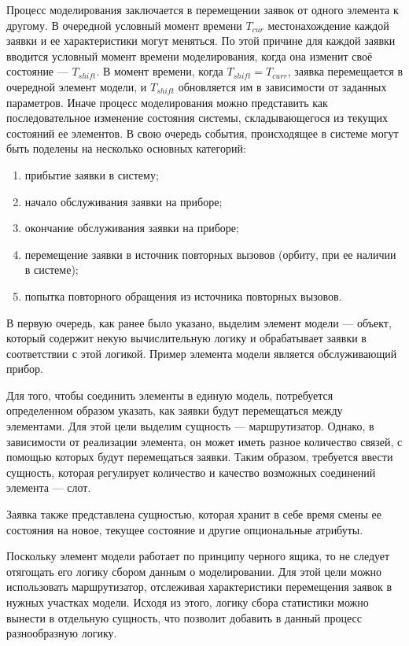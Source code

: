 Процесс моделирования заключается в перемещении заявок от одного элемента к другому. В очередной условный момент времени $T_{cur}$ местонахождение каждой заявки и ее характеристики могут меняться. По этой причине для каждой заявки вводится условный момент времени моделирования, когда она изменит своё состояние --- $T_{shift}$. В момент времени, когда $T_{shift} = T_{curr}$, заявка перемещается в очередной элемент модели, и  $T_{shift}$ обновляется им в зависимости от заданных параметров. Иначе процесс моделирования можно представить как последовательное изменение состояния системы, складывающегося из текущих состояний ее элементов. В свою очередь события, происходящее в системе могут быть поделены на несколько основных категорий:
\begin{enumerate}
	\item прибытие заявки в систему;
	\item начало обслуживания заявки на приборе;
	\item окончание обслуживания заявки на приборе;
	\item перемещение заявки в источник повторных вызовов (орбиту, при ее наличии в системе);
	\item попытка повторного обращения из источника повторных вызовов.
\end{enumerate}

В первую очередь, как ранее было указано, выделим элемент модели --- объект, который содержит некую вычислительную логику и обрабатывает заявки в соответствии с этой логикой. Пример элемента модели является обслуживающий прибор.

Для того, чтобы соединить элементы в единую модель, потребуется определенном образом указать, как заявки будут перемещаться между элементами. Для этой цели выделим сущность --- маршрутизатор. Однако, в зависимости от реализации элемента, он может иметь разное количество связей, с помощью которых будут перемещаться заявки. Таким образом, требуется ввести сущность, которая регулирует количество и качество возможных соединений элемента --- слот.

Заявка также представлена сущностью, которая хранит в себе время смены ее состояния на новое, текущее состояние и другие опциональные атрибуты.

Поскольку элемент модели работает по принципу черного ящика, то не следует отягощать его логику сбором данным о моделировании. Для этой цели можно использовать маршрутизатор, отслеживая характеристики перемещения заявок в нужных участках модели. Исходя из этого, логику сбора статистики можно вынести в отдельную сущность, что позволит добавить в данный процесс разнообразную логику.

